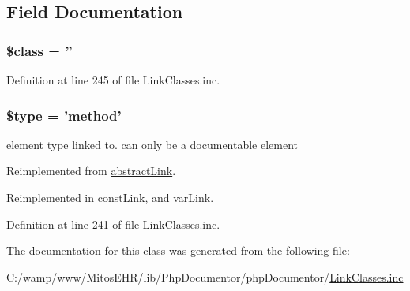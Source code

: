 \subsection{\-Field \-Documentation}
\hypertarget{classmethod_link_a252ba022809910ea710a068fc1bab657}{
\subsubsection[{\$class}]{\setlength{\rightskip}{0pt plus 5cm}\$class = ''}}\label{classmethod_link_a252ba022809910ea710a068fc1bab657}


\-Definition at line 245 of file \-Link\-Classes.\-inc.

\hypertarget{classmethod_link_a9a4a6fba2208984cabb3afacadf33919}{
\subsubsection[{\$type}]{\setlength{\rightskip}{0pt plus 5cm}\$type = 'method'}}\label{classmethod_link_a9a4a6fba2208984cabb3afacadf33919}
element type linked to. can only be a documentable element 

\-Reimplemented from \hyperlink{classabstract_link_a9a4a6fba2208984cabb3afacadf33919}{abstract\-Link}.



\-Reimplemented in \hyperlink{classconst_link_a9a4a6fba2208984cabb3afacadf33919}{const\-Link}, and \hyperlink{classvar_link_a9a4a6fba2208984cabb3afacadf33919}{var\-Link}.



\-Definition at line 241 of file \-Link\-Classes.\-inc.



\-The documentation for this class was generated from the following file\-:\begin{DoxyCompactItemize}
\item 
\-C\-:/wamp/www/\-Mitos\-E\-H\-R/lib/\-Php\-Documentor/php\-Documentor/\hyperlink{_link_classes_8inc}{\-Link\-Classes.\-inc}\end{DoxyCompactItemize}
